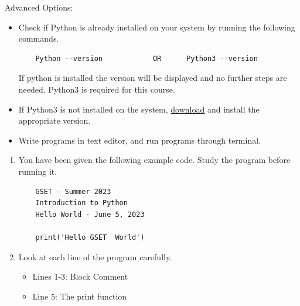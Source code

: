 \documentclass[12pt]{article}
\begin{document}
\begin{description}[labelindent=1cm]
Advanced Options:
\begin{itemize}

	\item Check if Python is already installed on your system by running the following commands.

	\begin{lstlisting} 
	Python --version 			OR 		Python3 --version
	\end{lstlisting}

	If python is installed the version will be displayed and no further steps are needed. Python3 is required for this course. 

	\item If Python3 is not installed on the system, \href{https://www.python.org/downloads/}{download} and install the appropriate version. 
		
	\item Write programs in text editor, and run programs through terminal.

\end{itemize}	
\newpage

\item[\textbf{\underline{Part 2 - The Python Code:}}] \hfill \vspace{0mm}
\begin{enumerate}
    \item You have been given the following example code. Study the program before running it.
	\begin{lstlisting}
	GSET - Summer 2023
	Introduction to Python  
	Hello World - June 5, 2023

	print('Hello GSET  World')
	\end{lstlisting}

	\item	
Look at each line of the program carefully.
	\begin{itemize}
		\item Lines 1-3: Block Comment 
		\item Line 5: The print function
	\end{itemize}
	
\end{enumerate}

	\item[\textbf{\underline{Part 3 - Testing:}}] \hfill \vspace{0mm}
	\begin{enumerate}
	

\end{enumerate}
\end{description}
\end{document}
